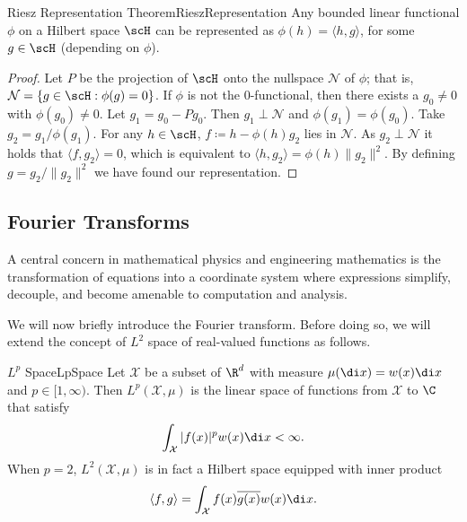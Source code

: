 \begin{thm}{Riesz Representation Theorem}{RieszRepresentation}
	Any bounded linear functional $\phi$ on a Hilbert space $\scH$ can be represented as $\phi(h) = \langle h, g \rangle$, for some $g \in \scH$ (depending on $\phi$).
\end{thm}

\begin{proof}
	Let $P$ be the projection of $\scH$ onto the nullspace $\mathcal{N}$ of $\phi$; that is, $\mathcal{N} = \{g \in \scH : \phi(g) = 0\}$. If $\phi$ is not the 0-functional, then there exists a $g_0 \neq 0$ with $\phi(g_0) \neq 0$. Let $g_1 = g_0 - Pg_0$. Then $g_1 \perp \mathcal{N}$ and $\phi(g_1) = \phi(g_0)$. Take $g_2 = g_1 / \phi(g_1)$. For any $h \in \scH$, $f \coloneqq h - \phi(h)g_2$ lies in $\mathcal{N}$. As $g_2 \perp \mathcal{N}$ it holds that $\langle f, g_2 \rangle = 0$, which is equivalent to $\langle h, g_2 \rangle = \phi(h) \|g_2\|^2$. By defining $g = g_2 / \|g_2\|^2$ we have found our representation.
\end{proof}

\subsection{Fourier Transforms}
A central concern in mathematical physics and engineering mathematics is the transformation of equations into a coordinate system where expressions simplify, decouple, and become amenable to computation and analysis.

We will now briefly introduce the Fourier transform. Before doing so, we will extend the concept of $L^2$ space of real-valued functions as follows.

\begin{defn}{$L^p$ Space}{LpSpace}
	Let $\mathcal{X}$ be a subset of $\R^d$ with measure $\mu(\di x) = w(x) \di x$ and $p \in [1, \infty)$. Then $L^p(\mathcal{X}, \mu)$ is the linear space of functions from $\mathcal{X}$ to $\C$ that satisfy
	\begin{equation}
		\int_{\mathcal{X}} |f(x)|^p w(x) \di x < \infty. \label{eq:LpSpaceCondition}
	\end{equation}
	When $p=2$, $L^2(\mathcal{X}, \mu)$ is in fact a Hilbert space equipped with inner product
	\begin{equation}
		\langle f, g \rangle = \int_{\mathcal{X}} f(x) \overline{g(x)} w(x) \di x. \label{eq:LpInnerProduct}
	\end{equation}
\end{defn}

